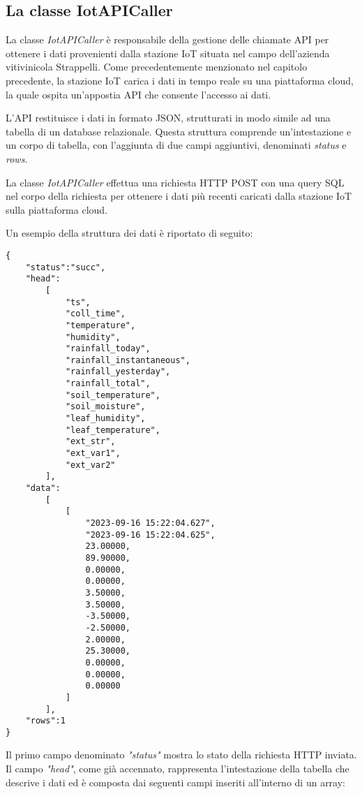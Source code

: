 \subsection{La classe IotAPICaller}

La classe \textit{IotAPICaller} è responsabile della gestione delle chiamate API per ottenere i dati provenienti dalla stazione IoT situata nel campo dell'azienda vitivinicola Strappelli. Come precedentemente menzionato nel capitolo precedente, la stazione IoT carica i dati in tempo reale su una piattaforma cloud, la quale ospita un'appostia API che consente l'accesso ai dati.

L'API restituisce i dati in formato JSON, strutturati in modo simile ad una tabella di un database relazionale. Questa struttura comprende un'intestazione e un corpo di tabella, con l'aggiunta di due campi aggiuntivi, denominati \textit{status} e \textit{rows}.

La classe \textit{IotAPICaller} effettua una richiesta HTTP POST con una query SQL nel corpo della richiesta per ottenere i dati più recenti caricati dalla stazione IoT sulla piattaforma cloud.

Un esempio della struttura dei dati è riportato di seguito:

\begin{lstlisting}[caption=File JSON restituito dall'API della stazione IoT, label=lst:iotjson, captionpos=b]
 {
    "status":"succ",
    "head":
        [
            "ts",
            "coll_time",
            "temperature",
            "humidity",
            "rainfall_today",
            "rainfall_instantaneous",
            "rainfall_yesterday",
            "rainfall_total",
            "soil_temperature",
            "soil_moisture",
            "leaf_humidity",
            "leaf_temperature",
            "ext_str",
            "ext_var1",
            "ext_var2"
        ],
    "data":
        [
            [
                "2023-09-16 15:22:04.627",
                "2023-09-16 15:22:04.625",
                23.00000,
                89.90000,
                0.00000,
                0.00000,
                3.50000,
                3.50000,
                -3.50000,
                -2.50000,
                2.00000,
                25.30000,
                0.00000,
                0.00000,
                0.00000
            ]
        ],
    "rows":1
}
\end{lstlisting}

Il primo campo denominato \textit{"status"} mostra lo stato della richiesta HTTP inviata.
Il campo \textit{"head"}, come già accennato, rappresenta l'intestazione della tabella che descrive i dati ed è composta dai seguenti campi inseriti all'interno di un array:


